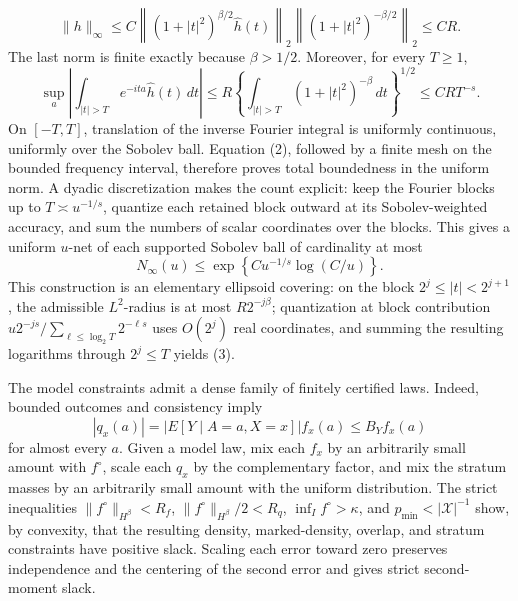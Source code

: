 \[
 \|h\|_\infty
 \le C\left\|(1+|t|^2)^{\beta/2}\widehat h(t)\right\|_2
       \left\|(1+|t|^2)^{-\beta/2}\right\|_2
 \le C R.                                                    \tag{1}
\]
The last norm is finite exactly because \(\beta>1/2\).  Moreover, for every \(T\ge1\),
\[
 \sup_a\left|\int_{|t|>T}e^{-ita}\widehat h(t)\,dt\right|
 \le R\left\{\int_{|t|>T}(1+|t|^2)^{-\beta}\,dt\right\}^{1/2}
 \le C R T^{-s}.                                             \tag{2}
\]
On \([-T,T]\), translation of the inverse Fourier integral is uniformly continuous, uniformly over the Sobolev ball.  Equation (2), followed by a finite mesh on the bounded frequency interval, therefore proves total boundedness in the uniform norm.  A dyadic discretization makes the count explicit: keep the Fourier blocks up to \(T\asymp u^{-1/s}\), quantize each retained block outward at its Sobolev-weighted accuracy, and sum the numbers of scalar coordinates over the blocks.  This gives a uniform \(u\)-net of each supported Sobolev ball of cardinality at most
\[
 N_\infty(u)\le
 \exp\left\{C u^{-1/s}\log(C/u)\right\}.                    \tag{3}
\]
This construction is an elementary ellipsoid covering: on the block \(2^j\le |t|<2^{j+1}\), the admissible \(L^2\)-radius is at most \(R2^{-j\beta}\); quantization at block contribution \(u2^{-j s}/\sum_{\ell\le\log_2T}2^{-\ell s}\) uses \(O(2^j)\) real coordinates, and summing the resulting logarithms through \(2^j\le T\) yields (3).

The model constraints admit a dense family of finitely certified laws.  Indeed, bounded outcomes and consistency imply
\[
 |q_x(a)|=|E[Y\mid A=a,X=x]|f_x(a)\le B_Y f_x(a)              \tag{4}
\]
for almost every \(a\).  Given a model law, mix each \(f_x\) by an arbitrarily small amount with \(f^{\circ}\), scale each \(q_x\) by the complementary factor, and mix the stratum masses by an arbitrarily small amount with the uniform distribution.  The strict inequalities \(\|f^{\circ}\|_{H^\beta}<R_f\), \(\|f^{\circ}\|_{H^\beta}/2<R_q\), \(\inf_I f^{\circ}>\kappa\), and \(p_{\min}<|\mathcal X|^{-1}\) show, by convexity, that the resulting density, marked-density, overlap, and stratum constraints have positive slack.  Scaling each error toward zero preserves independence and the centering of the second error and gives strict second-moment slack.

